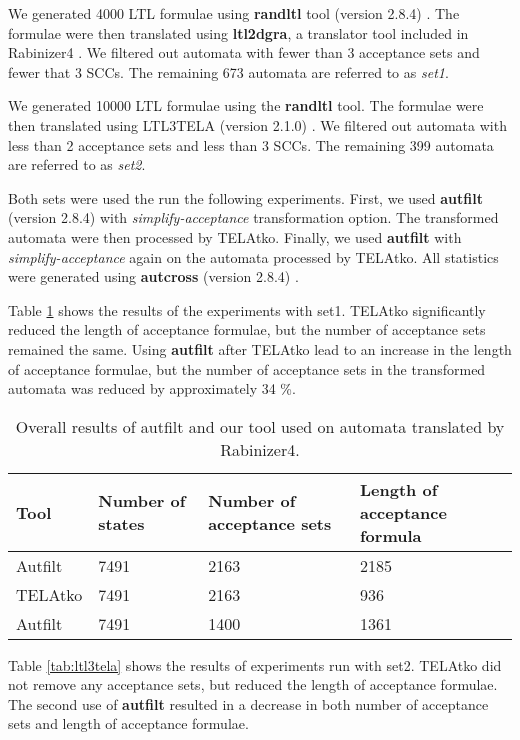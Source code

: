 \documentclass[
  digital, %
  twoside, %
  table,   %
  lof,     %
  lot,     %
]{fithesis3}
\begin{document}
We generated 4000 LTL \cite{ltl} formulae using \textbf{randltl} tool (version 2.8.4) \cite{randltl}. The formulae were then translated using \textbf{ltl2dgra}, a translator tool included in Rabinizer4 \cite{rabinizer4}. We filtered out automata with fewer than 3 acceptance sets and fewer that 3 SCCs. The remaining 673 automata are referred to as \emph{set1}.

We generated 10000 LTL formulae using the \textbf{randltl} tool. The formulae were then translated using LTL3TELA (version 2.1.0) \cite{ltl3tela}. We filtered out automata with less than 2 acceptance sets and less than 3 SCCs. The remaining 399 automata are referred to as \emph{set2}.

Both sets were used the run the following experiments. First, we used \textbf{autfilt} (version 2.8.4) \cite{spot} with \emph{simplify-acceptance} transformation option. The transformed automata were then processed by TELAtko. Finally, we used \textbf{autfilt} with \emph{simplify-acceptance} again on the automata processed by TELAtko. All statistics were generated using \textbf{autcross} (version 2.8.4) \cite{spot}.

Table \ref{tab:rabinizer4} shows the results of the experiments with set1. TELAtko significantly reduced the length of acceptance formulae, but the number of acceptance sets remained the same. Using \textbf{autfilt} after TELAtko lead to an increase in the length of acceptance formulae, but the number of acceptance sets in the transformed automata was reduced by approximately 34 \%.

\begin{table}[h]
  \begin{tabularx}{\textwidth}{lXXX}
    \toprule
    Tool & Number of states & Number of acceptance sets & Length of acceptance formula  \\
    \midrule
    Autfilt & 7491 & 2163 & 2185 \\
    TELAtko & 7491 & 2163 & 936 \\
    Autfilt & 7491 & 1400 & 1361 \\    
    \bottomrule
  \end{tabularx}
  \caption{Overall results of autfilt and our tool used on automata translated by Rabinizer4.}
  \label{tab:rabinizer4}
\end{table}

Table \ref{tab:ltl3tela} shows the results of experiments run with set2. TELAtko did not remove any acceptance sets, but reduced the length of acceptance formulae. The second use of \textbf{autfilt} resulted in a decrease in both number of acceptance sets and length of acceptance formulae.
\end{document}
